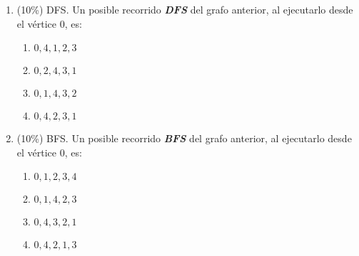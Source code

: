 \documentclass[10 pt]{article}
\begin{document}
\begin{multicols}{2}
\begin{enumerate}[label=(\alph*)]
\item (10\%) DFS. Un posible recorrido \textbf{\textit{DFS}} del grafo anterior, al ejecutarlo desde el vértice $0$, es:
\begin{enumerate}[label=(\roman*)]
\item $0, 4, 1, 2, 3$
\item $0, 2, 4, 3, 1$
\item $0, 1, 4, 3, 2$
\item $0, 4, 2, 3, 1$
\end{enumerate}
\item (10\%) BFS. Un posible recorrido \textbf{\textit{BFS}} del grafo anterior, al ejecutarlo desde el vértice $0$, es:
\begin{enumerate}[label=(\roman*)]
\item $0, 1, 2, 3, 4$
\item $0, 1, 4, 2, 3$
\item $0, 4, 3, 2, 1$
\item $0, 4, 2, 1, 3$
\end{enumerate}
\end{enumerate}

\end{multicols}
\end{document}
